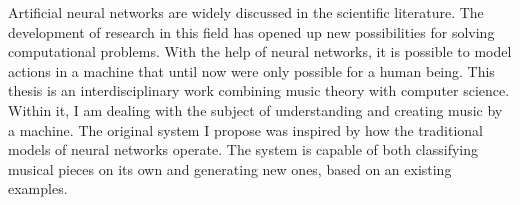 \noindent Artificial neural networks are widely discussed in the scientific literature. The development of research in this field has opened up new possibilities for solving computational problems. With the help of neural networks, it is possible to model actions in a machine that until now were only possible for a human being. This thesis is an interdisciplinary work combining music theory with computer science. Within it, I am dealing with the subject of understanding and creating music by a machine. The original system I propose was inspired by how the traditional models of neural networks operate. The system is capable of both classifying musical pieces on its own and generating new ones, based on an existing examples.